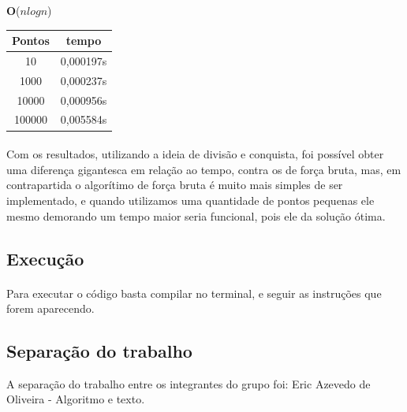 \documentclass[12pt]{article}
\begin{document}
 \begin{center}
    

\textbf{O}($nlogn$)

\begin{tabular}{||c c  ||} 

 \hline
 Pontos & tempo \\ [0.6ex] 
 \hline\hline
  10& 0,000197s  \\ 
 \hline
 1000 & 0,000237s \\
 \hline
 10000 & 0,000956s \\
 \hline
 100000 & 0,005584s \\ [1ex] 
 \hline
\end{tabular}

\end{center}

\paragraph{}Com os resultados, utilizando a ideia de divisão e conquista, foi possível obter uma  diferença gigantesca  em relação ao tempo, contra os de força bruta, mas, em contrapartida o algorítimo de força bruta é muito mais simples de ser implementado, e quando utilizamos uma quantidade de pontos pequenas ele mesmo demorando um tempo maior seria funcional, pois ele  da solução ótima.
\subsection{Execução}

\paragraph{}Para executar o código basta compilar  no terminal, e seguir as instruções que forem aparecendo.

\subsection{Separação do trabalho}
A separação do trabalho entre os integrantes do grupo foi:
Eric Azevedo de Oliveira - Algoritmo e  texto.

\nocite{*}


\end{document}
